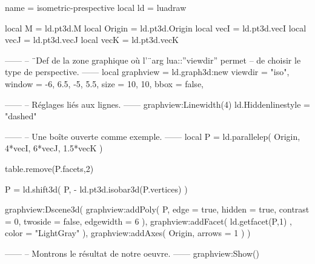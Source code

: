 \documentclass[border = 3pt]{standalone}
\begin{document}
\begin{luadraw*}{name = isometric-prespective}
local ld = luadraw

local M      = ld.pt3d.M
local Origin = ld.pt3d.Origin
local vecI   = ld.pt3d.vecI
local vecJ   = ld.pt3d.vecJ
local vecK   = ld.pt3d.vecK

------
-- ¨Def de la zone graphique où l'¨arg lua::''viewdir'' permet
-- de choisir le type de perspective.
------
local graphview = ld.graph3d:new{
  viewdir = "iso",
  window  = {-6, 6.5, -5, 5.5},
  size    = {10, 10},
  bbox    = false,
}

------
-- Réglages liés aux lignes.
------
graphview:Linewidth(4)
ld.Hiddenlinestyle = "dashed"

------
-- Une boîte ouverte comme exemple.
------
local P = ld.parallelep(
  Origin,
  4*vecI, 6*vecJ, 1.5*vecK
)

table.remove(P.facets,2)

P = ld.shift3d(
  P,
  - ld.pt3d.isobar3d(P.vertices)
)

graphview:Dscene3d(
  graphview:addPoly(
    P,
    {
      edge      = true,
      hidden    = true,
      contrast  = 0,
      twoside   = false,
      edgewidth = 6
    }
  ),
  graphview:addFacet(
    ld.getfacet(P,1) ,
    {color = "LightGray"}
  ),
  graphview:addAxes(
    Origin,
    {arrows = 1}
  )
)

------
-- Montrons le résultat de notre oeuvre.
------
graphview:Show()
\end{luadraw*}
\end{document}
